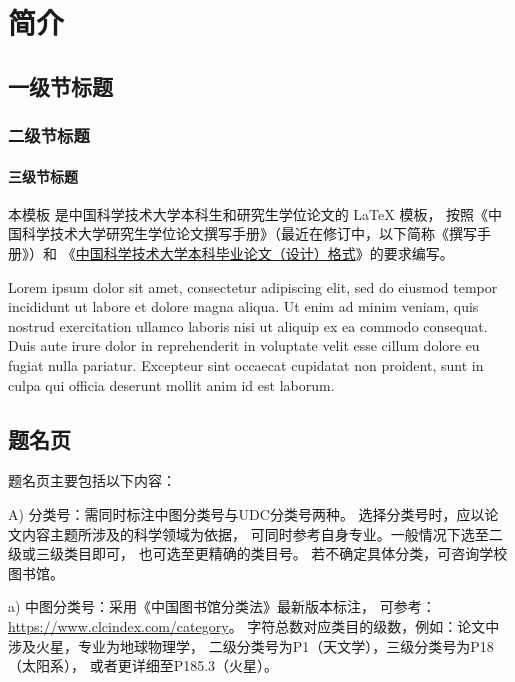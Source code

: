 
\chapter{简介}

\section{一级节标题}

\subsection{二级节标题}

\subsubsection{三级节标题}

本模板  是中国科学技术大学本科生和研究生学位论文的 \LaTeX{}
模板， 按照《中国科学技术大学研究生学位论文撰写手册》（最近在修订中，以下简称《撰写手册》）和
《\href{https://www.teach.ustc.edu.cn/?attachment_id=13867}
{中国科学技术大学本科毕业论文（设计）格式}》的要求编写。

Lorem ipsum dolor sit amet, consectetur adipiscing elit, sed do eiusmod tempor
incididunt ut labore et dolore magna aliqua.
Ut enim ad minim veniam, quis nostrud exercitation ullamco laboris nisi ut
aliquip ex ea commodo consequat.
Duis aute irure dolor in reprehenderit in voluptate velit esse cillum dolore eu
fugiat nulla pariatur.
Excepteur sint occaecat cupidatat non proident, sunt in culpa qui officia
deserunt mollit anim id est laborum.


\section{题名页}

题名页主要包括以下内容：

A) 分类号：需同时标注中图分类号与UDC分类号两种。
选择分类号时，应以论文内容主题所涉及的科学领域为依据，
可同时参考自身专业。一般情况下选至二级或三级类目即可，
也可选至更精确的类目号。
若不确定具体分类，可咨询学校图书馆。

a) 中图分类号：采用《中国图书馆分类法》最新版本标注，
可参考：\url{https://www.clcindex.com/category}。
字符总数对应类目的级数，例如：论文中涉及火星，专业为地球物理学，
二级分类号为P1（天文学），三级分类号为P18（太阳系），
或者更详细至P185.3（火星）。

